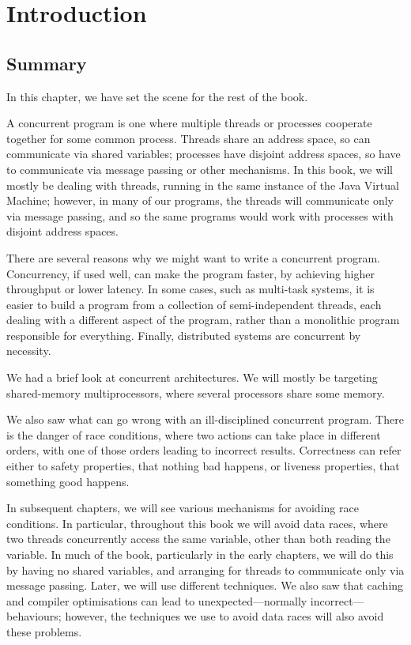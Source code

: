 \chapter{Introduction}
\label{chap:intro}



\section{Summary}

In this chapter, we have set the scene for the rest of the book.

A concurrent program is one where multiple threads or processes cooperate
together for some common process.  Threads share an address space, so can
communicate via shared variables; processes have disjoint address spaces, so
have to communicate via message passing or other mechanisms.  In this book, we
will mostly be dealing with threads, running in the same instance of the Java
Virtual Machine; however, in many of our programs, the threads will
communicate only via message passing, and so the same programs would work with
processes with disjoint address spaces.

There are several reasons why we might want to write a concurrent program.
Concurrency, if used well, can make the program faster, by achieving higher
throughput or lower latency.  In some cases, such as multi-task systems, it
is easier to build a program from a collection of semi-independent threads,
each dealing with a different aspect of the program, rather than a monolithic
program responsible for everything.  Finally, distributed systems are
concurrent by necessity.

We had a brief look at concurrent architectures.  We will mostly be targeting
shared-memory multiprocessors, where several processors share some memory.  

We also saw what can go wrong with an ill-disciplined concurrent program.
There is the danger of race conditions, where two actions can take place in
different orders, with one of those orders leading to incorrect results.  
Correctness can refer either to safety properties, that nothing bad happens,
or liveness properties, that something good happens. 

In subsequent chapters, we will see various mechanisms for avoiding race
conditions.  In particular, throughout this book we will avoid data races,
where two threads concurrently access the same variable, other than both
reading the variable.  In much of the book, particularly in the early
chapters, we will do this by having no shared variables, and arranging for
threads to communicate only via message passing.  Later, we will use different
techniques.  We also saw that caching and compiler optimisations can lead to
unexpected---normally incorrect---behaviours; however, the techniques we use
to avoid data races will also avoid these problems.



